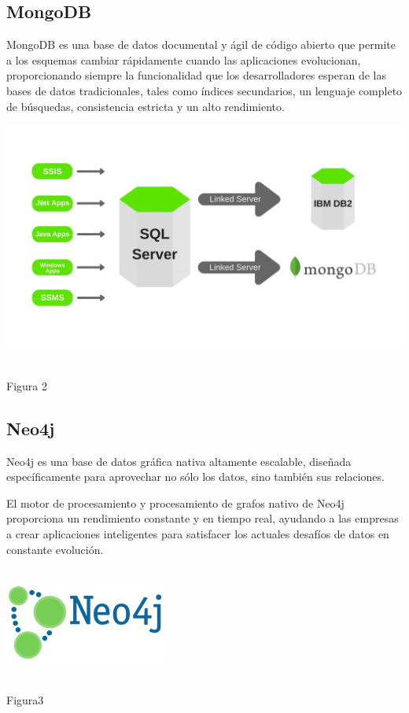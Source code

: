 \documentclass[conference]{IEEEtran}
\begin{document}
\subsection{MongoDB}
MongoDB es una base de datos documental y \'agil de c\'odigo abierto que permite a los esquemas cambiar r\'apidamente cuando las aplicaciones evolucionan, proporcionando siempre la funcionalidad que los desarrolladores esperan de las bases de datos tradicionales, tales como \'indices secundarios, un lenguaje completo de b\'usquedas, consistencia estricta y un alto rendimiento.\cite{mongo}
\\
\begin{flushright}
\includegraphics[scale=0.15]{Imagenes/mongodbsql.jpg}
\end{flushright}
\centering
\\Figura 2
\subsection{Neo4j}
Neo4j es una base de datos gr\'afica nativa altamente escalable, diseñada espec\'ificamente para aprovechar no s\'olo los datos, sino tambi\'en sus relaciones.

El motor de procesamiento y procesamiento de grafos nativo de Neo4j proporciona un rendimiento constante y en tiempo real, ayudando a las empresas a crear aplicaciones inteligentes para satisfacer los actuales desafíos de datos en constante evolución.\cite{neo}
\\\\
\begin{flushright}
\includegraphics[scale=2.5]{Imagenes/neo4j.png}
\end{flushright}
\centering
\\Figura3
\end{document}

